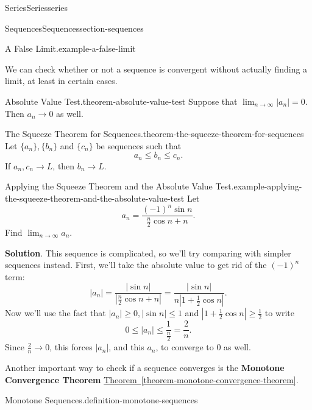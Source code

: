 \documentclass[oneside,10pt,]{book}
\newcommand{\terminology}[1]{\textbf{#1}}
\numberwithin{equation}{section}
\begin{document}
\begin{chapterptx}{Series}{}{Series}{}{}{series}
\begin{sectionptx}{Sequences}{}{Sequences}{}{}{section-sequences}
\begin{example}{A False Limit.}{example-a-false-limit}
\end{example}
\hypertarget{p-814}{}%
We can check whether or not a sequence is convergent without actually finding a limit, at least in certain cases.%
\begin{theorem}{Absolute Value Test.}{}{theorem-absolute-value-test}%
\hypertarget{p-815}{}%
Suppose that \(\lim_{n\to\infty}|a_{n}| = 0\). Then \(a_{n}\to0\) as well.%
\end{theorem}
\begin{theorem}{The Squeeze Theorem for Sequences.}{}{theorem-the-squeeze-theorem-for-sequences}%
\hypertarget{p-816}{}%
Let \(\{a_{n}\}, \{b_{n}\}\) and \(\{c_{n}\}\) be sequences such that%
\begin{equation*}
a_{n} \leq b_{n} \leq c_{n}\text{.}
\end{equation*}
If \(a_{n},c_{n}\to L\), then \(b_{n}\to L\).%
\end{theorem}
\begin{example}{Applying the Squeeze Theorem and the Absolute Value Test.}{example-applying-the-squeeze-theorem-and-the-absolute-value-test}%
\hypertarget{p-817}{}%
Let%
\begin{equation*}
a_{n} = \frac{(-1)^{n}\sin n}{\frac{n}{2}\cos n + n}\text{.}
\end{equation*}
Find \(\lim_{n\to\infty}a_{n}\).%
\par\smallskip%
\noindent\textbf{Solution}.\hypertarget{solution-169}{}\quad%
\hypertarget{p-818}{}%
This sequence is complicated, so we'll try comparing with simpler sequences instead. First, we'll take the absolute value to get rid of the \((-1)^{n}\) term:%
\begin{equation*}
|a_{n}| = \frac{|\sin n|}{\left|\frac{n}{2}\cos n + n\right|} = \frac{|\sin n|}{n\left|1 + \frac{1}{2}\cos n\right|}\text{.}
\end{equation*}
Now we'll use the fact that \(|a_{n}|\geq 0, |\sin n| \leq 1\) and \(\left|1 + \frac{1}{2}\cos n\right| \geq \frac{1}{2}\) to write%
\begin{equation*}
0\leq |a_{n}| \leq \frac{1}{\frac{n}{2}} = \frac{2}{n}\text{.}
\end{equation*}
Since \(\frac{2}{n}\to 0\), this forces \(|a_{n}|\), and this \(a_{n}\), to converge to \(0\) as well.%
\end{example}
\hypertarget{p-819}{}%
Another important way to check if a sequence converges is the \terminology{Monotone Convergence Theorem} \hyperref[theorem-monotone-convergence-theorem]{Theorem~\ref{theorem-monotone-convergence-theorem}}.%
\begin{definition}{Monotone Sequences.}{definition-monotone-sequences}%

\end{definition}
\end{sectionptx}
\end{chapterptx}
\end{document}
